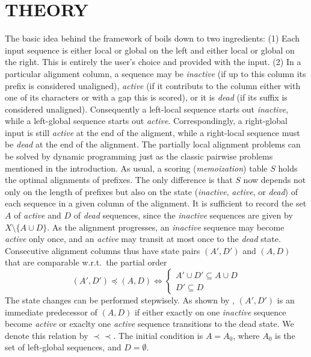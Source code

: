 \documentclass[a4paper,10pt]{article}
\newcommand{\pprec}{\mathrel{\prec\!\!\!\prec}}
\begin{document}
\section{\uppercase{Theory}}

The basic idea behind the framework of \citet{Retzlaff:18a} boils down to
two ingredients: (1) Each input sequence is either local or global on the
left and either local or global on the right. This is entirely the user's
choice and provided with the input. (2) In a particular alignment column, a
sequence may be \textit{inactive} (if up to this column its prefix is
considered unaligned), \textit{active} (if it contributs to the column
either with one of its characters or with a gap this is scored), or it is
\textit{dead} (if its suffix is considered unaligned). Consequently a
left-local sequence starts out \textit{inactive}, while a left-global
sequence starts out \textit{active}. Correspondingly, a right-global input
is still \textit{active} at the end of the aligment, while a right-local
sequence must be \textit{dead} at the end of the alignment. The partially
local alignment problems can be solved by dynamic programming just as the
classic pairwise problems mentioned in the introduction. As usual, a
scoring (\emph{memoization}) table $S$ holds the optimal alignments of
prefixes. The only difference is that $S$ now depends not only on the
length of prefixes but also on the state (\textit{inactive},
\textit{active}, or \textit{dead}) of each sequence in a given column of
the alignment. It is sufficient to record the set $A$ of \textit{active}
and $D$ of \textit{dead} sequences, since the \emph{inactive} sequences are
given by $X\setminus\{A \cup D\}$.  As the alignment progresses, an
\textit{inactive} sequence may become \textit{active} only once, and an
\textit{active} may transit at most once to the \textit{dead}
state. Consecutive alignment columns thus have state pairs $(A',D')$ and
$(A,D)$ that are comparable w.r.t.\ the partial order
\begin{equation}
  (A',D')\preceq(A,D) \iff
    \begin{cases} A'\cup D'\subseteq A\cup D \\
      D'\subseteq D
    \end{cases}
\end{equation}
The state changes can be performed stepwisely. As shown by
\citet{Retzlaff:18a}, $(A',D')$ is an immediate predecessor of $(A,D)$ if
either exactly on one \textit{inactive} sequence become \textit{active} or
exaclty one \textit{active} sequence transitions to the dead state.  We
denote this relation by $\pprec$. The initial condition is $A=A_0$, where
$A_0$ is the set of left-global sequences, and $D=\emptyset$.
\end{document}
